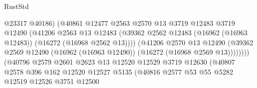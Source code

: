 \begin{lexlean}{RustStd}
\begin{coremodule}
                                          @23317
                                          @40186)
                                        (@40861
                                          @12477
                                          @2563
                                          @2570
                                          @13
                                          @3719
                                          @12483
                                          @3719
                                          @12490
                                          (@41206
                                            @2563
                                            @13
                                            @12483
                                            (@39362
                                              @2562
                                              @12483
                                              (@16962 (@16963 @12483))
                                              (@16272 (@16968 @2562 @13))))
                                          (@41206
                                            @2570
                                            @13
                                            @12490
                                            (@39362
                                              @2569
                                              @12490
                                              (@16962 (@16963 @12490))
                                              (@16272 (@16968 @2569 @13))))))))
                                  (@40796
                                    @2579
                                    @2601
                                    @2623
                                    @13
                                    @12520
                                    @12529
                                    @3719
                                    @12630
                                    (@40807
                                      @2578
                                      @396
                                      @162
                                      @12520
                                      @12527
                                      @5135
                                      (@40816
                                        @2577
                                        @53
                                        @55
                                        @5282
                                        @12519
                                        @12526
                                        @3751
                                        @12500

\end{coremodule}
\end{lexlean}
